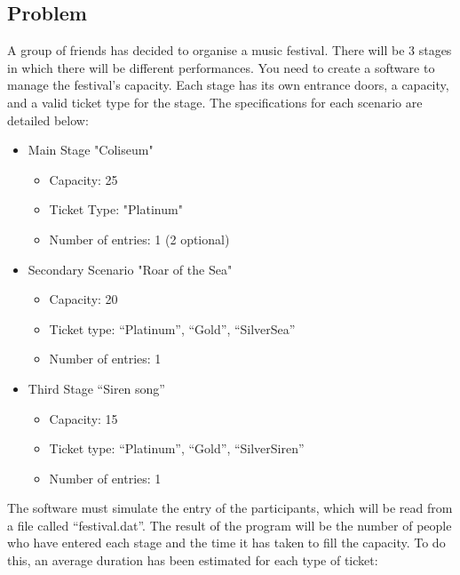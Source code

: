 \documentclass[a4paper]{article}
\theoremstyle{plain}
\theoremstyle{definition}
\begin{document}
	    \subsection{Problem}
	    A group of friends has decided to organise a music festival. There will be 3 stages in which there will be
        different performances. You need to create a software to manage the festival's capacity. Each stage has its
        own entrance doors, a capacity, and a valid ticket type for the stage. The specifications for each scenario are detailed below:\newline
        \begin{itemize}
            \item Main Stage "Coliseum"
                \begin{itemize}
                    \item Capacity: 25
                    \item Ticket Type: "Platinum"
                    \item Number of entries: 1 (2 optional)
                \end{itemize}
            \item Secondary Scenario "Roar of the Sea"
                \begin{itemize}
                    \item Capacity: 20
                    \item Ticket type: “Platinum”, “Gold”, “SilverSea”
                    \item Number of entries: 1
                \end{itemize}
            \item Third Stage “Siren song”
                \begin{itemize}
                    \item Capacity: 15
                    \item Ticket type: “Platinum”, “Gold”, “SilverSiren”
                    \item Number of entries: 1
                \end{itemize}
        \end{itemize}\newline
        
    The software must simulate the entry of the participants, which will be read from a file called “festival.dat”.
    The result of the program will be the number of people who have entered each stage and the time it has taken
    to fill the capacity. To do this, an average duration has been estimated for each type of ticket:
\end{document}
